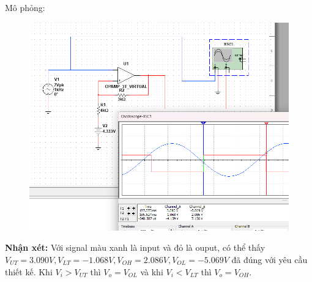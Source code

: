 Mô phỏng:
\begin{figure}[H]
	\centering
	\includegraphics[scale=0.5]{image/C11_6b.png}
\end{figure}
\textbf{Nhận xét:} Với signal màu xanh là input và đỏ là ouput, có thể thấy $V_{UT}=3.090V, V_{LT}=-1.068V, V_{OH}=2.086V, V_{OL}=-5.069V$ đã đúng với yêu cầu thiết kế.
Khi $V_i>V_{UT}$ thì $V_o=V_{OL}$ và khi $V_i<V_{LT}$ thì $V_o=V_{OH}$.
